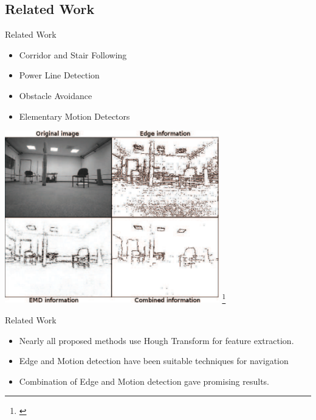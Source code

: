\documentclass{beamer}
\begin{document}
\subsection{Related Work}
\begin{frame}
\begin{block}{Related Work}
\begin{itemize}
\item Corridor and Stair Following \cite{Bills2011}
\item Power Line Detection \cite{Golightly2005, Zhengrong2008, Katrasnik2010}
\item Obstacle Avoidance \cite{Jurriaans2011}
\item Elementary Motion Detectors \cite{Gerke2011}
\end{itemize}
\end{block}
\end{frame}

\begin{frame}
\begin{center}
\includegraphics[width=0.7\textwidth]{images/gerke2011.png}
\footnote{\cite{Gerke2011}}
\end{center}
\end{frame}

\begin{frame}
\begin{block}{Related Work}
\begin{itemize}
\item Nearly all proposed methods use Hough Transform for feature extraction.
\item Edge and Motion detection have been suitable techniques for navigation 
\item Combination of Edge and Motion detection gave promising results.
\end{itemize}
\end{block}
\end{frame}
\end{document}
